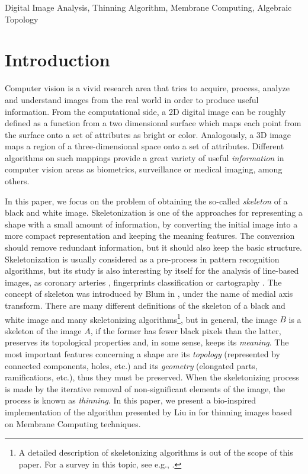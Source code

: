 \documentclass[journal]{IEEEtran}
\begin{document}
\begin{IEEEkeywords}
Digital Image Analysis, Thinning Algorithm, Membrane Computing, Algebraic Topology
\end{IEEEkeywords}

\section{Introduction}
Computer vision \cite{ShapiroS01} is a vivid research area that
tries to acquire, process, analyze and understand images from the
real world in order to produce useful information. From the
computational side, a 2D digital image can be roughly defined as a
function from a two dimensional surface which maps each point from
the surface onto a set of attributes as bright or color.
Analogously, a 3D image maps a region of a three-dimensional space onto
a set of attributes. Different algorithms on such mappings provide a
great variety of useful {\it information} in computer vision areas
as biometrics, surveillance or medical imaging, among others.

In this paper, we focus on the problem of obtaining the so-called
{\it skeleton} of a black and white image. Skeletonization is one of
the approaches for representing a shape with a small amount of
information, by converting the initial image into a more compact
representation and keeping the meaning features. The conversion
should remove redundant information, but it should also keep the
basic structure. Skeletonization is usually considered as a
pre-process in pattern recognition algorithms, but its study is also
interesting by itself for the analysis of line-based images, as
coronary arteries \cite{Dufresne1994343}, fingerprints
classification \cite{HongbinJY2007} or cartography
\cite{Lee2000165}. The concept of skeleton was introduced by Blum in
\cite{Blum62Associative_Plenumpress}, under the name of medial axis
transform. There are many different definitions of the skeleton of a
black and white image and many skeletonizing algorithms\footnote{A
detailed description of skeletonizing algorithms is out of the scope
of this paper. For a survey in this topic, see e.g.,
\cite{DBLP:journals/amcs/SaeedTRA10}.}, but in general, the image
$B$ is a skeleton of the image $A$, if the former has fewer black
pixels than the latter, preserves its topological properties and, in
some sense, keeps its \emph{meaning}. The most important features
concerning a shape are its \emph{topology} (represented by connected
components, holes, etc.) and its \emph{geometry} (elongated parts,
ramifications, etc.), thus they must be preserved. When the
skeletonizing process is made by the iterative removal of
non-significant elements of the image, the process is known as {\it
thinning}. In this paper, we present a bio-inspired implementation
of the algorithm presented by Liu in \cite{liu20093d,DBLP:journals/cgf/LiuCLJ10} for thinning
images based on Membrane Computing techniques.
\end{document}
